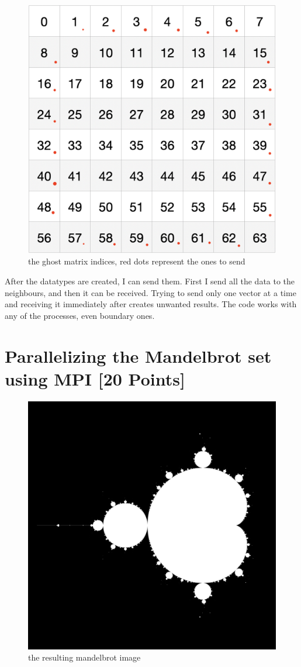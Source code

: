 \documentclass[unicode,11pt,a4paper,oneside,numbers=endperiod,openany]{scrartcl}
\begin{document}
\begin{figure}[H]
\centering
\includegraphics[width=0.5\linewidth]{ghost_matrix.png}
\caption{the ghost matrix indices, red dots represent the ones to send}
\end{figure}

After the datatypes are created, I can send them.
\newline
First I send all the data to the neighbours, and then it can be received. Trying to send only one vector at a time and receiving it immediately after creates unwanted results.
\newline
The code works with any of the processes, even boundary ones.

\section{Parallelizing the Mandelbrot set using MPI [20 Points]}

\begin{figure}[H]
\centering
\includegraphics[width=0.6\linewidth]{mandel.png}
\caption{the resulting mandelbrot image}
\end{figure}
\end{document}
